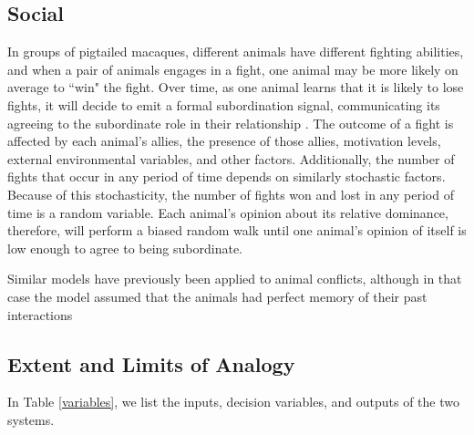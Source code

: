 \documentclass{article}
\begin{document}
\subsection{Social }
In groups of pigtailed macaques, different animals have different fighting abilities, and when a pair of animals engages in a fight, one animal may be more likely on average to ``win" the fight.  Over time, as one animal learns that it is likely to lose fights, it will decide to emit a formal subordination signal, communicating its agreeing to the subordinate role in their relationship \citep{Flack:2007kx, Flack:2006fk,Flack:2004oq, Waal:1985fk,Caldecott:1986uk}.  The outcome of a fight is affected by each animal's allies, the presence of those allies, motivation levels,  external environmental variables, and other factors.  Additionally, the number of fights that occur in any period of time depends on similarly stochastic factors.  Because of this stochasticity, the number of fights won and lost in any period of time is a random variable.  Each animal's opinion about its relative dominance, therefore, will perform a biased random walk until one animal's opinion of itself is low enough to agree to being subordinate.

Similar models have previously been applied to animal conflicts, although in that case the model assumed that the animals had perfect memory of their past interactions \citep{Froment:2010fk}

\subsection{Extent and Limits of Analogy }

In Table \ref{variables}, we list the inputs, decision variables, and outputs of the two systems.  

\end{document}

